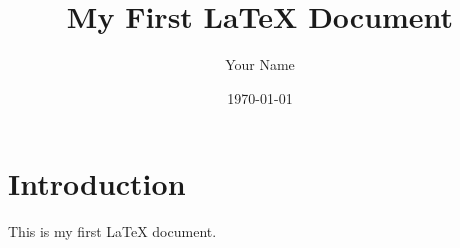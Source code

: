 \documentclass{article}
\title{My First LaTeX Document}
\author{Your Name}
\date{\today}
\begin{document}
\maketitle

\section{Introduction}
This is my first LaTeX document.
\end{document}

